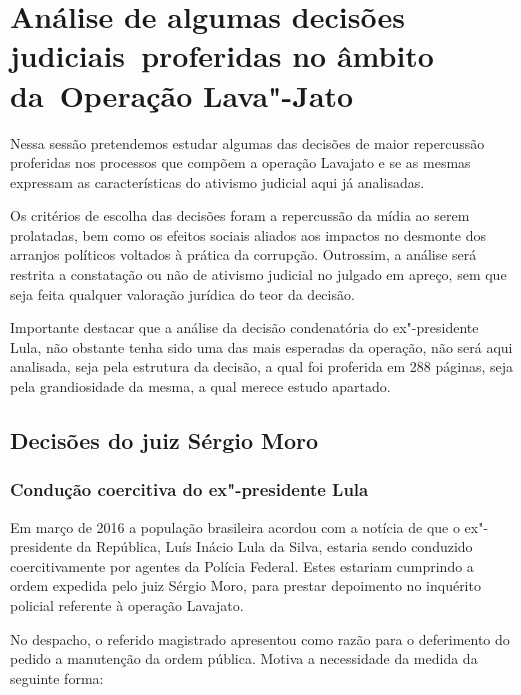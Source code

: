 \section{Análise de algumas decisões judiciais~proferidas
no âmbito da~Operação Lava"-Jato}

Nessa sessão pretendemos estudar algumas das decisões de maior
repercussão proferidas nos processos que compõem a operação Lavajato e
se as mesmas expressam as características do ativismo judicial aqui já
analisadas.

Os critérios de escolha das decisões foram a repercussão da mídia ao
serem prolatadas, bem como os efeitos sociais aliados aos impactos no
desmonte dos arranjos políticos voltados à prática da corrupção.
Outrossim, a análise será restrita a constatação ou não de ativismo
judicial no julgado em apreço, sem que seja feita qualquer valoração
jurídica do teor da decisão.

Importante destacar que a análise da decisão condenatória do ex"-presidente Lula, não obstante tenha sido uma das mais esperadas da operação, não será aqui analisada, seja pela estrutura da decisão, a qual foi proferida em 288 páginas, seja pela grandiosidade da mesma, a qual merece estudo apartado.

\subsection{Decisões do juiz Sérgio Moro}

\subsubsection{Condução coercitiva do ex"-presidente Lula}

Em março de 2016 a população brasileira acordou com a notícia de que o
ex"-presidente da República, Luís Inácio Lula da Silva, estaria sendo
conduzido coercitivamente por agentes da Polícia Federal. Estes estariam
cumprindo a ordem expedida pelo juiz Sérgio Moro, para prestar
depoimento no inquérito policial referente à operação Lavajato.

No despacho, o referido magistrado apresentou como razão para o
deferimento do pedido a manutenção da ordem pública. Motiva a
necessidade da medida da seguinte forma:

